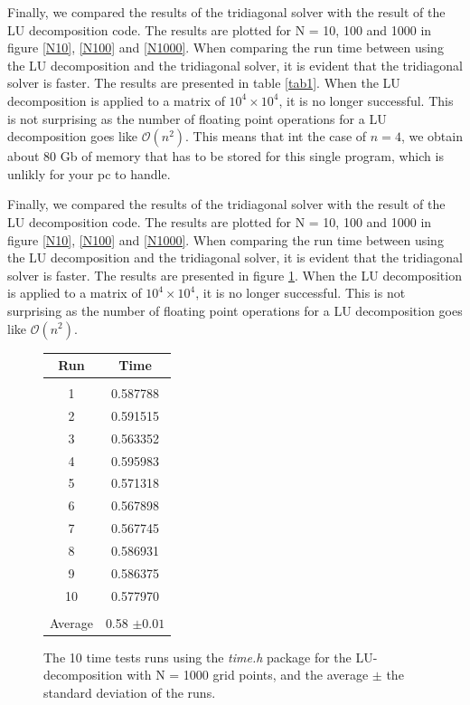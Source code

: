 \documentclass[%
reprint,
amsmath,amssymb,
aps,
]{revtex4-1}
\begin{document}
Finally, we compared the results of the tridiagonal solver with the result of the LU decomposition code. The results are plotted for N = 10, 100 and 1000 in figure \ref{N10}, \ref{N100} and \ref{N1000}. When comparing the run time between using the LU decomposition and the tridiagonal solver, it is evident that the tridiagonal solver is faster. The results are presented in table \ref{tab1}. When the LU decomposition is applied to a matrix of $10^4 \times 10^4$, it is no longer successful. This is not surprising as the number of floating point operations for a LU decomposition goes like $\mathcal{O}(n^2)$. This means that int the case of $n = 4$, we obtain about 80 Gb of memory that has to be stored for this single program, which is unlikly for your pc to handle.
\newpage

Finally, we compared the results of the tridiagonal solver with the result of the LU decomposition code. The results are plotted for N = 10, 100 and 1000 in figure \ref{N10}, \ref{N100} and \ref{N1000}. When comparing the run time between using the LU decomposition and the tridiagonal solver, it is evident that the tridiagonal solver is faster. The results are presented in figure \ref{tab2}. When the LU decomposition is applied to a matrix of $10^4 \times 10^4$, it is no longer successful. This is not surprising as the number of floating point operations for a LU decomposition goes like $\mathcal{O}(n^2)$.

\begin{figure}[!h]
	\begin{tabular} {|c|c|}
		\hline
		Run &  Time \\
		\hline
		& \\ 
		1 & 0.587788\\
		2 & 0.591515\\
		3 & 0.563352\\
		4 & 0.595983\\
		5 & 0.571318\\
		6 & 0.567898\\
		7 & 0.567745\\
		8 & 0.586931\\
		9 & 0.586375\\
		10& 0.577970\\
		\hline
		& \\ 
		Average & 0.58 $\pm 0.01 $\\
		\hline
	\end{tabular}
	\label{tab2}
	\caption{The 10 time tests runs using the \textit{time.h} package for the LU-decomposition with N = 1000 grid points, and the average $\pm$ the standard deviation of the runs.}
\end{figure}
\end{document}
